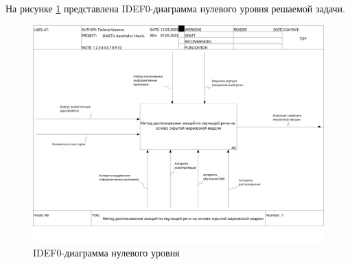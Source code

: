 На рисунке \ref{fig:idef0} представлена IDEF0-диаграмма нулевого уровня решаемой задачи.
\begin{figure}[H]
	\centering
	\includegraphics[width=\linewidth]{assets/01_A0}
	\caption{IDEF0-диаграмма нулевого уровня}
	\label{fig:idef0}
\end{figure}



